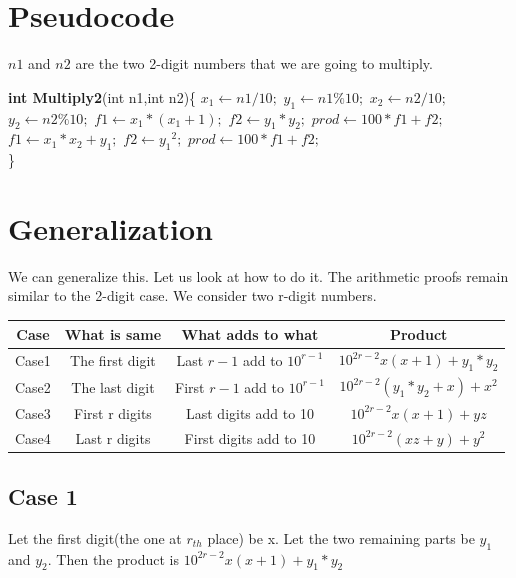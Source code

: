 \documentclass[titlepage]{article}
\begin{document}
\section{Pseudocode}
$n1$ and $n2$ are the two 2-digit numbers that we are going to multiply.
\begin{algorithmic}
    \State \textbf{int Multiply2}(int n1,int n2)\{
     \State$x_1 \leftarrow n1/10;$  
     \State$y_1 \leftarrow n1\%10;$
     \State$x_2 \leftarrow n2/10;$
     \State$y_2 \leftarrow n2\%10;$
     \State {}
         \State$f1\leftarrow x_1*(x_1+1);$  
         \State$f2\leftarrow y_1*y_2;$  
         \State$prod\leftarrow 100*f1+f2;$
     \EndIf
     \State {}
        \State$f1\leftarrow x_1*x_2+y_1;$
        \State$f2\leftarrow {y_1}^2;$
        \State$prod\leftarrow 100*f1+f2;$
     \EndIf
\\
\}
\end{algorithmic}

\section{Generalization}
We can generalize this. Let us look at how to do it. The arithmetic proofs remain similar to the 2-digit case. We consider two r-digit numbers.
\begin{table}[h]
\begin{center}
\begin{tabular}{|c|c|c|c|}
    \hline
    Case & What is same & What adds to what & Product\\
    \hline
    Case1 & The first digit & Last $r-1$ add to $10^{r-1}$ & $10^{2r-2}x(x+1)+y_1*y_2$\\
    \hline
    Case2 & The last digit & First $r-1$ add to $10^{r-1}$ & $10^{2r-2}(y_1*y_2+x)+x^2$\\
    \hline
    Case3 & First r digits & Last digits add to 10 & $10^{2r-2}x(x + 1)+yz$\\
    \hline
    Case4 & Last r digits & First digits add to 10 & $10^{2r-2}(xz+y)+y^2$\\
    \hline
\end{tabular}
\end{center}
\end{table}
\subsection{Case 1}
Let the first digit(the one at $r_{th}$ place) be x. Let the two remaining parts be $y_1$ and $y_2$. Then the product is $10^{2r-2}x(x+1)+y_1*y_2$
\end{document}
